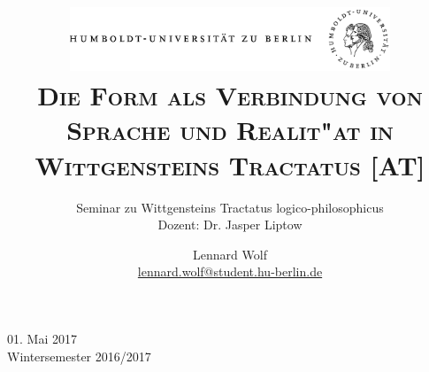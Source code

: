 \documentclass[a4paper, emulatestandardclasses, 12pt]{scrartcl}
\date{\vspace{-3ex}}
\begin{document}
\title{\vspace{5ex}
	\includegraphics*[width=0.72\textwidth]{images/hu_logo.png}\\
	\vspace{30pt}
	\scshape\LARGE{Die Form als Verbindung von Sprache und Realit"at in Wittgensteins Tractatus [AT]}}
	
	\subtitle{\vspace{20pt}Seminar zu Wittgensteins Tractatus logico-philosophicus\\
	\vspace{6pt}
          Dozent: Dr. Jasper Liptow}


\author{\vspace{-4pt}Lennard Wolf\\
        \small{\href{mailto:lennard.wolf@student.hu-berlin.de}{lennard.wolf@student.hu-berlin.de}}}      

\maketitle

\vspace{\fill}

\begin{minipage}[b]{\textwidth}
    \centering
    \onehalfspacing
    \large   
    01. Mai 2017\\
    Wintersemester 2016/2017

    \vspace{-20mm} 
\end{minipage}%
\thispagestyle{empty}
\newpage
\setcounter{page}{1}
\end{document}
